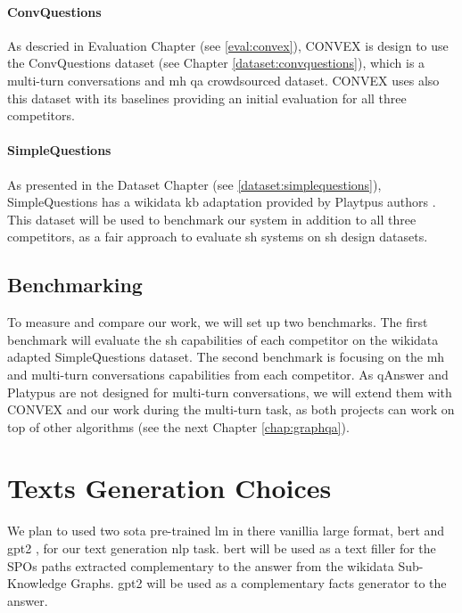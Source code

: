 \paragraph{ConvQuestions}
As descried in Evaluation Chapter (see \ref{eval:convex}), CONVEX \autocite{paper:convex} is design to use the ConvQuestions dataset (see Chapter \ref{dataset:convquestions}), which is a multi-turn conversations and \gls{mh} \gls{qa} crowdsourced dataset. CONVEX uses also this dataset with its baselines providing an initial evaluation for all three competitors.

\paragraph{SimpleQuestions}
As presented in the Dataset Chapter (see \ref{dataset:simplequestions}), SimpleQuestions has a \gls{wikidata} \gls{kb} adaptation provided by Playtpus authors \autocite{paper:InProceedingsPellissier-Tanon.P-TD-d-ACM-S_18}. This dataset will be used to benchmark our system in addition to all three competitors, as a fair approach to evaluate \gls{sh} systems on \gls{sh} design datasets.

\subsection{Benchmarking}
To measure and compare our work, we will set up two benchmarks. The first benchmark will evaluate the \gls{sh} capabilities of each competitor on the \gls{wikidata} adapted SimpleQuestions dataset. The second benchmark is focusing on the \gls{mh} and multi-turn conversations capabilities from each competitor. As qAnswer and Platypus are not designed for multi-turn conversations, we will extend them with CONVEX and our work during the multi-turn task, as both projects can work on top of other algorithms (see the next Chapter \ref{chap:graphqa}).



\section{Texts Generation Choices}
We plan to used two \gls{sota} pre-trained \gls{lm} in there vanillia large format, \gls{bert} \autocite{paper:devlin-etal-2019-bert} and \gls{gpt2} \autocite{papers:gpt2}, for our text generation \gls{nlp} task. \gls{bert} will be used as a text filler for the SPOs paths extracted complementary to the answer from the \gls{wikidata} Sub-Knowledge Graphs. \gls{gpt2} will be used as a complementary facts generator to the answer.

